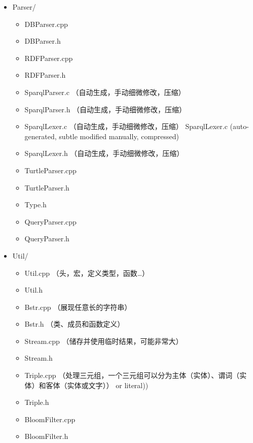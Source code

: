 \documentclass[titlepage, a4paper, 12pt]{article}
\begin{document}

\begin{itemize}
	\item
	Parser/
	
	\begin{itemize}
		\item
		DBParser.cpp
		\item
		DBParser.h
		\item
		RDFParser.cpp
		\item
		RDFParser.h
		\item
		SparqlParser.c （自动生成，手动细微修改，压缩）
		\item
		SparqlParser.h （自动生成，手动细微修改，压缩）
		\item
		SparqlLexer.c （自动生成，手动细微修改，压缩）
		SparqlLexer.c (auto-generated, subtle modified manually, compressed)
		\item
		SparqlLexer.h （自动生成，手动细微修改，压缩）
		\item
		TurtleParser.cpp
		\item
		TurtleParser.h
		\item
		Type.h
		\item
		QueryParser.cpp
		\item
		QueryParser.h
	\end{itemize}
\end{itemize}


\begin{itemize}
	\item
	Util/
	
	\begin{itemize}
		\item
		Util.cpp （头，宏，定义类型，函数\ldots{}）
		\item
		Util.h
		\item
		Bstr.cpp （展现任意长的字符串）
		\item
		Bstr.h （类、成员和函数定义）
		\item
		Stream.cpp （储存并使用临时结果，可能非常大）
		\item
		Stream.h
		\item
		Triple.cpp （处理三元组，一个三元组可以分为主体（实体）、谓词（实体）和客体（实体或文字）） or literal))
		\item
		Triple.h
		\item
		BloomFilter.cpp
		\item
		BloomFilter.h
	\end{itemize}
\end{itemize}
\end{document}
